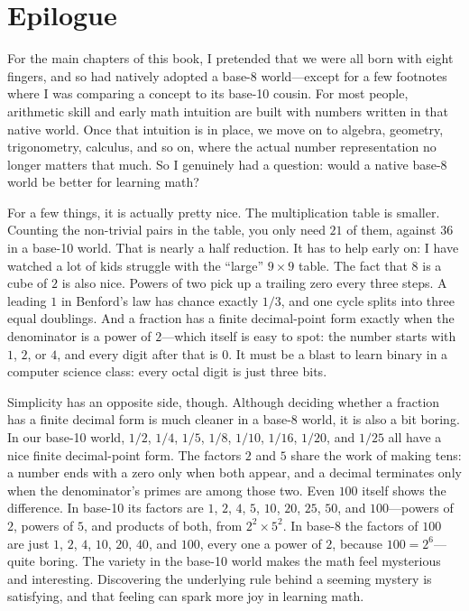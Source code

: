 \chapter{Epilogue}
\label{ch:epilogue}

For the main chapters of this book, I pretended that we were all born with eight fingers, and so had natively adopted a base-8 world---except for a few footnotes where I was comparing a concept to its base-10 cousin. For most people, arithmetic skill and early math intuition are built with numbers written in that native world. Once that intuition is in place, we move on to algebra, geometry, trigonometry, calculus, and so on, where the actual number representation no longer matters that much. So I genuinely had a question: would a native base-8 world be better for learning math?

For a few things, it is actually pretty nice. The multiplication table is smaller. Counting the non-trivial pairs in the table, you only need $21$ of them, against $36$ in a base-10 world. That is nearly a half reduction. It has to help early on: I have watched a lot of kids struggle with the ``large'' $9 \times 9$ table. The fact that $8$ is a cube of $2$ is also nice. Powers of two pick up a trailing zero every three steps. A leading $1$ in Benford's law has chance exactly $1/3$, and one cycle splits into three equal doublings. And a fraction has a finite decimal-point form exactly when the denominator is a power of $2$---which itself is easy to spot: the number starts with $1$, $2$, or $4$, and every digit after that is $0$. It must be a blast to learn binary in a computer science class: every octal digit is just three bits.

Simplicity has an opposite side, though. Although deciding whether a fraction has a finite decimal form is much cleaner in a base-8 world, it is also a bit boring. In our base-10 world, $1/2$, $1/4$, $1/5$, $1/8$, $1/10$, $1/16$, $1/20$, and $1/25$ all have a nice finite decimal-point form. The factors $2$ and $5$ share the work of making tens: a number ends with a zero only when both appear, and a decimal terminates only when the denominator's primes are among those two. Even $100$ itself shows the difference. In base-10 its factors are $1$, $2$, $4$, $5$, $10$, $20$, $25$, $50$, and $100$---powers of $2$, powers of $5$, and products of both, from $2^{2} \times 5^{2}$. In base-8 the factors of $100$ are just $1$, $2$, $4$, $10$, $20$, $40$, and $100$, every one a power of $2$, because $100 = 2^{6}$---quite boring. The variety in the base-10 world makes the math feel mysterious and interesting. Discovering the underlying rule behind a seeming mystery is satisfying, and that feeling can spark more joy in learning math.

